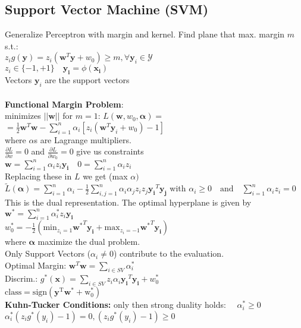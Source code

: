 \subsection*{Support Vector Machine (SVM)}
Generalize Perceptron with margin and kernel.
Find plane that max. margin $m$ s.t.:\\
$z_ig(\mathbf{y})=z_i(\mathbf{w}^T\mathbf{y}+w_0)\geq m,\forall \mathbf{y}_i \in \mathcal{Y}$\\
$z_i \in \{-1,+1\}\quad \mathbf{y_i} = \phi(\mathbf{x_i})$\\
Vectors $\mathbf{y}_i$ are the support vectors \\ \\
\textbf{Functional Margin Problem}:\\
minimizes $||\mathbf{w}||$ for $m{=}1$: 
$L(\mathbf{w}, w_0, \mathbf{\alpha}) {=}$\\
$=\frac{1}{2}\mathbf{w}^T\mathbf{w}{-}\sum_{i=1}^n\alpha_i[z_i(\mathbf{w}^T\mathbf{y}_i{}+w_0){-}1]$\\
where $\alpha$s are Lagrange multipliers.\\
$\frac{\partial L}{\partial w} {=} 0$ and $\frac{\partial L}{\partial w_0} {=} 0$ give us constraints\\
$\mathbf{w}=\sum_{i=1}^n\alpha_iz_i\mathbf{y_i} \quad 0=\sum_{i=1}^n\alpha_iz_i$\\
Replacing these in $L$ we get (max $\alpha)$\\
$\tilde{L}(\mathbf{\alpha}){=}\sum_{i=1}^n\alpha_i{-}\frac{1}{2}\sum_{i,j=1}^n\alpha_i\alpha_jz_iz_j\mathbf{y_i}^T\mathbf{y_j}$
with $\alpha_i\geq0\quad\mathrm{and}\quad\sum_{i=1}^n\alpha_iz_i=0$\\
This is the dual representation.
The optimal hyperplane is given by\\
$\mathbf{w^*}=\sum_{i=1}^n\alpha_i^*z_i\mathbf{y_i}$\\
$ w_0^*{=}{-}\frac{1}{2}(\mathrm{min}_{z_i=1}\mathbf{w^*}^T\mathbf{y_i}{+}\mathrm{max}_{z_i=-1}\mathbf{w^*}^T\mathbf{y_i})$\\
where $\mathbf{\alpha}$ maximize the dual problem.\\
Only Support Vectors ($\alpha_i\not=0$) contribute to the evaluation.\\
Optimal Margin: $\mathbf{w}^T\mathbf{w}=\sum_{i\in SV}\alpha_i^*$\\
Discrim.: $g^*(\mathbf{x}){=}\sum_{i\in SV}z_i\alpha_i\mathbf{y_i}^T\mathbf{y_i}{+}w^*_0$\\
$\mathrm{class} = \mathrm{sign(\mathbf{y}^T\mathbf{w}^*+w_0^*)}$ \\
\textbf{Kuhn-Tucker Conditions:} only then strong duality holds: $\quad \alpha_i^* \geq 0$\\
$\alpha_i^*(z_ig^*(y_i)-1)= 0, (z_ig^*(y_i)-1) \geq 0$


